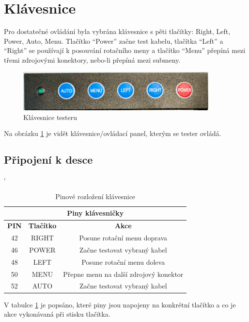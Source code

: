 
\section{Klávesnice}
Pro dostatečné ovládání byla vybrána klávesnice s pěti tlačítky: Right, Left, Power, Auto, Menu. Tlačítko “Power” začne test kabelu, tlačítka “Left” a “Right” se používají k posouvání rotačního meny a tlačítko “Menu” přepíná mezi třemi zdrojovými konektory, nebo-li přepíná mezi submeny.

\begin{figure}[H]
	\centering
	\includegraphics[width=0.9\textwidth]{pictures/keyboard.jpeg}
    	\caption{Klávesnice testeru}
   	\label{fig:keyborad}
\end{figure}

Na obrázku \ref{fig:keyborad} je vidět klávesnice/ovládací panel, kterým se tester ovládá.

\subsection*{Připojení k desce}
\begin{table} [h!]
	\caption{Pinové rozložení klávesnice}
	\label{table:pinKB}
	\centering
	\catcode` %
	\begin{tabular}[c]{|| c | c | c ||}
	\hline
		\multicolumn{3}{||c||}{Piny klávesničky} \\
	\hline
 		 \textbf{PIN} & \textbf{Tlačítko} & \textbf{Akce}\\
	\hline
		42 &  RIGHT & Posune rotační menu doprava\\
	\hline
		46 & POWER &  Začne testovat vybraný kabel\\
	\hline
		48 & LEFT & Posune rotační menu doleva\\
	\hline
		50 & MENU & Přepne menu na další zdrojový konektor \\
	\hline
		52 & AUTO & Začne testovat vybraný kabel\\
	\hline
	\end{tabular}
\end{table}

V tabulce  \ref{table:pinKB} je popsáno, které piny jsou napojeny na konkrétní tlačítko a co je akce vykonávaná při stisku tlačítka.
